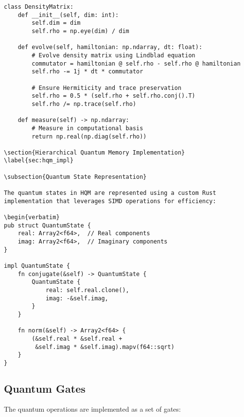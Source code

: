 \documentclass[10pt]{article}
\begin{document}
\begin{verbatim}
class DensityMatrix:
    def __init__(self, dim: int):
        self.dim = dim
        self.rho = np.eye(dim) / dim
        
    def evolve(self, hamiltonian: np.ndarray, dt: float):
        # Evolve density matrix using Lindblad equation
        commutator = hamiltonian @ self.rho - self.rho @ hamiltonian
        self.rho -= 1j * dt * commutator
        
        # Ensure Hermiticity and trace preservation
        self.rho = 0.5 * (self.rho + self.rho.conj().T)
        self.rho /= np.trace(self.rho)
    
    def measure(self) -> np.ndarray:
        # Measure in computational basis
        return np.real(np.diag(self.rho))

\section{Hierarchical Quantum Memory Implementation}
\label{sec:hqm_impl}

\subsection{Quantum State Representation}

The quantum states in HQM are represented using a custom Rust implementation that leverages SIMD operations for efficiency:

\begin{verbatim}
pub struct QuantumState {
    real: Array2<f64>,  // Real components
    imag: Array2<f64>,  // Imaginary components
}

impl QuantumState {
    fn conjugate(&self) -> QuantumState {
        QuantumState {
            real: self.real.clone(),
            imag: -&self.imag,
        }
    }

    fn norm(&self) -> Array2<f64> {
        (&self.real * &self.real + 
         &self.imag * &self.imag).mapv(f64::sqrt)
    }
}
\end{verbatim}

\subsection{Quantum Gates}

The quantum operations are implemented as a set of gates:
\end{document}
